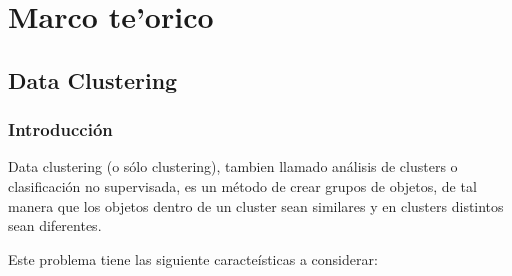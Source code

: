 \chapter{Marco te'orico} \label{chap:ssimilar}

\vspace{5 mm}

\section{Data Clustering} \label{sect:dclust}

\subsection{Introducci\'on} \label{sect:dclusti}

Data clustering (o s\'olo clustering), tambien llamado an\'alisis de clusters o 
clasificaci\'on no supervisada, es un m\'etodo de crear grupos de objetos,
de tal manera que los objetos dentro de un cluster sean similares y 
en clusters distintos sean diferentes. \cite{GaChJi2007}

Este problema tiene las siguiente caracte\'isticas a considerar: \cite{SwAjAm2009}

